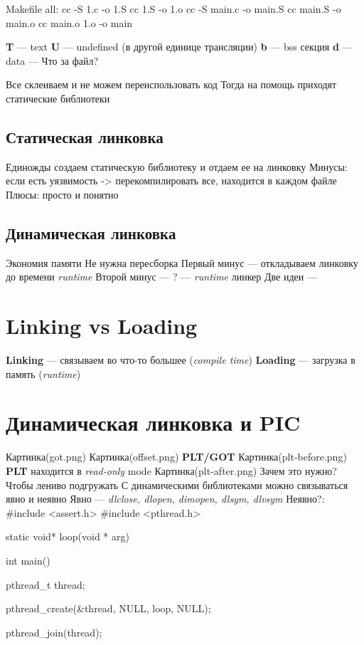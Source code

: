 Makefile
all:
    cc -S 1.c -o 1.S
    cc 1.S -o 1.o
    cc -S main.c -o main.S
    cc main.S -o main.o
    cc main.o 1.o -o main


\textbf{T} --- text
\textbf{U} --- undefined (в другой единице трансляции)
\textbf{b} --- bss секция
\textbf{d} --- data
 --- Что за файл?

Все склеиваем и не можем переиспользовать код
Тогда на помощь приходят статические библиотеки

\subsection{Статическая линковка}
Единожды создаем статическую библиотеку и отдаем ее на линковку
Минусы: если есть уязвимость -> перекомпилировать все, находится в каждом файле
Плюсы: просто и понятно

\subsection{Динамическая линковка}
Экономия памяти
Не нужна пересборка
Первый минус --- откладываем линковку до времени \emph{runtime}
Второй минус --- ?
 --- \emph{runtime} линкер
Две идеи --- 


\section{Linking vs Loading}
\textbf{Linking} --- связываем во что-то большее (\emph{compile time})
\textbf{Loading} --- загрузка в память (\emph{runtime})

\section{Динамическая линковка и PIC}
Картинка(got.png)
Картинка(offset.png)
\textbf{PLT/GOT}
Картинка(plt-before.png)
\textbf{PLT} находится в \emph{read-only} mode
Картинка(plt-after.png)
Зачем это нужно? Чтобы лениво подгружать
С динамическими библиотеками можно связываться явно и неявно
Явно --- \emph{dlclose, dlopen, dimopen, dlsym, dlvsym}
Неявно?:
#include <assert.h>
#include <pthread.h>

static void* loop(void * arg) {

}

int main() {
    pthread_t thread;

    pthread_create(&thread, NULL, loop, NULL);

    pthread_join(thread);
}

